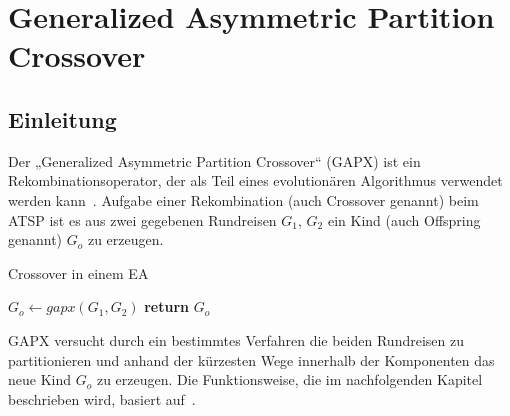 \chapter{Generalized Asymmetric Partition Crossover}

\label{gapx_einleitung}
\section{Einleitung}
Der „Generalized Asymmetric Partition Crossover“ (GAPX) ist ein
Rekombinationsoperator, der als Teil eines evolutionären Algorithmus
verwendet werden kann~\cite{gapx}. Aufgabe einer Rekombination (auch
Crossover genannt) beim ATSP ist es aus
zwei gegebenen Rundreisen $G_1$, $G_2$ ein Kind (auch Offspring genannt)
$G_o$ zu erzeugen.


\begin{algorithm}
\caption{Crossover in einem EA}\label{alg:crossover_ea}
\begin{algorithmic}[1]
\Comment{}
\State $G_o\gets gapx(G_1,G_2)$
\State \textbf{return} $G_o$
\EndProcedure
\end{algorithmic}
\end{algorithm}
\noindent
GAPX versucht durch ein bestimmtes Verfahren die beiden Rundreisen zu
partitionieren und anhand der kürzesten Wege innerhalb der Komponenten
das neue Kind $G_o$ zu erzeugen. Die
Funktionsweise, die im nachfolgenden Kapitel beschrieben wird, basiert
auf~\cite{gapx}.


